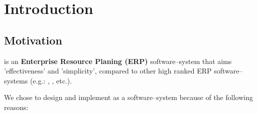 \chapter{Introduction}

\vspace{-1em}


\vspace{1em}

\section{Motivation}

\yerotherpblack is an \textbf{Enterprise Resource Planing (ERP)}
software--system that aims 'effectiveness' and 'simplicity',
compared to other high ranked ERP software--systems
(e.g.: \sageerp, \saperp, etc.).

We chose to design and implement \yerotherpblack as
a \thickclient software--system because of the
following reasons:

